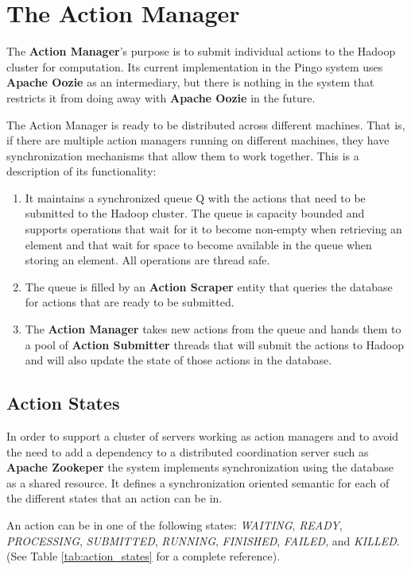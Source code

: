 \section{The Action Manager}
The \textbf{Action Manager}'s purpose is to submit individual actions to the Hadoop cluster for computation. Its current implementation in the Pingo system uses \textbf{Apache Oozie} as an intermediary, but there is nothing in the system that restricts it from doing away with \textbf{Apache Oozie} in the future.

The Action Manager is ready to be distributed across different machines. That is, if there are multiple action managers running on different machines, they have synchronization mechanisms that allow them to work together.  This is a description of its functionality:

\begin{enumerate}
\item It maintains a synchronized queue Q with the actions that need to be submitted to the Hadoop cluster. The queue is capacity bounded and supports operations that wait for it to become non-empty when retrieving an element and that wait for space to become available in the queue when storing an element. All operations are thread safe.
\item The queue is filled by an \textbf{Action Scraper} entity that queries the database for actions that are ready to be submitted.
\item The \textbf{Action Manager} takes new actions from the queue and hands them to a pool of \textbf{Action Submitter} threads that will submit the actions to Hadoop and will also update the state of those actions in the database.
\end{enumerate}

\subsection{Action States}
In order to support a cluster of servers working as action managers and to avoid the need to add a dependency to a distributed coordination server such as \textbf{Apache Zookeper} the system implements synchronization using the database as a shared resource.  It defines a synchronization oriented semantic for each of the different states that an action can be in.

An action can be in one of the following states: \textit{WAITING}, \textit{READY}, \textit{PROCESSING}, \textit{SUBMITTED}, \textit{RUNNING}, \textit{FINISHED}, \textit{FAILED}, and \textit{KILLED}.  (See Table \ref{tab:action_states} for a complete reference).

